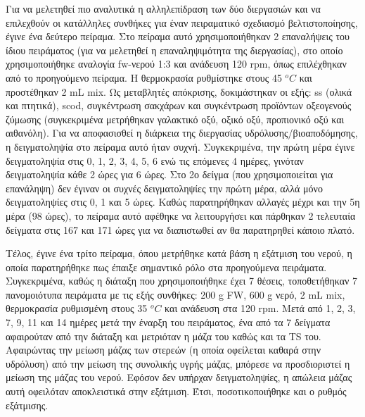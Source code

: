\documentclass[11pt]{report}
\begin{document}
Για να μελετηθεί πιο αναλυτικά η αλληλεπίδραση των δύο διεργασιών και να επιλεχθούν οι κατάλληλες συνθήκες για έναν πειραματικό σχεδιασμό βελτιστοποίησης, έγινε ένα δεύτερο πείραμα. Στο πείραμα αυτό χρησιμοποιήθηκαν 2 επαναλήψεις του ίδιου πειράματος (για να μελετηθεί η επαναληψιμότητα της διεργασίας), στο οποίο χρησιμοποιήθηκε αναλογία \acrshort{fw}-νερού 1:3 και ανάδευση 120 rpm, όπως επιλέχθηκαν από το προηγούμενο πείραμα. Η θερμοκρασία ρυθμίστηκε στους 45 \(^oC\) και προστέθηκαν 2 mL \acrshort{mix}. Ως μεταβλητές απόκρισης, δοκιμάστηκαν οι εξής: \acrshort{ss} (ολικά και πτητικά), \acrshort{scod}, συγκέντρωση σακχάρων και συγκέντρωση προϊόντων οξεογενούς ζύμωσης (συγκεκριμένα μετρήθηκαν γαλακτικό οξύ, οξικό οξύ, προπιονικό οξύ και αιθανόλη). Για να αποφασισθεί η διάρκεια της διεργασίας υδρόλυσης/βιοαποδόμησης, η δειγματοληψία στο πείραμα αυτό ήταν συχνή. Συγκεκριμένα, την πρώτη μέρα έγινε δειγματοληψία στις 0, 1, 2, 3, 4, 5, 6 ενώ τις επόμενες 4 ημέρες, γινόταν δειγματοληψία κάθε 2 ώρες για 6 ώρες. Στο 2ο δείγμα (που χρησιμοποιείται για επανάληψη) δεν έγιναν οι συχνές δειγματοληψίες την πρώτη μέρα, αλλά μόνο δειγματοληψίες στις 0, 1 και 5 ώρες. Καθώς παρατηρήθηκαν αλλαγές μέχρι και την 5η μέρα (98 ώρες), το πείραμα αυτό αφέθηκε να λειτουργήσει και πάρθηκαν 2 τελευταία δείγματα στις 167 και 171 ώρες για να διαπιστωθεί αν θα παρατηρηθεί κάποιο πλατό.

Τέλος, έγινε ένα τρίτο πείραμα, όπου μετρήθηκε κατά βάση η εξάτμιση του νερού, η οποία παρατηρήθηκε πως έπαιξε σημαντικό ρόλο στα προηγούμενα πειράματα. Συγκεκριμένα, καθώς η διάταξη που χρησιμοποιήθηκε έχει 7 θέσεις, τοποθετήθηκαν 7 πανομοιότυπα πειράματα με τις εξής συνθήκες: 200 g FW, 600 g νερό, 2 mL \acrshort{mix}, θερμοκρασία ρυθμισμένη στους 35 \(^oC\) και ανάδευση στα 120 rpm. Μετά από 1, 2, 3, 7, 9, 11 και 14 ημέρες μετά την έναρξη του πειράματος, ένα από τα 7 δείγματα αφαιρούταν από την διάταξη και μετριόταν η μάζα του καθώς και τα TS του. Αφαιρώντας την μείωση μάζας των στερεών (η οποία οφείλεται καθαρά στην υδρόλυση) από την μείωση της συνολικής υγρής μάζας, μπόρεσε να προσδιοριστεί η μείωση της μάζας του νερού. Εφόσον δεν υπήρχαν δειγματοληψίες, η απώλεια μάζας αυτή οφειλόταν αποκλειστικά στην εξάτμιση. Έτσι, ποσοτικοποιήθηκε και ο ρυθμός εξάτμισης.
\end{document}
